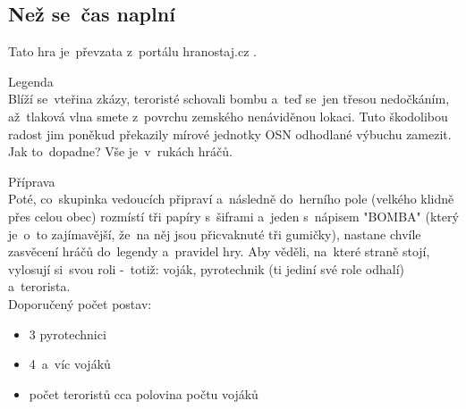 
\vspace{-2mm}
\subsection{Než se~čas naplní}
Tato hra je~převzata z~portálu hranostaj.cz \cite{NezSeCasNaplni}.
\vspace{2mm}

Legenda\vspace{2mm}\\
Blíží se~vteřina zkázy, teroristé schovali bombu a~teď se~jen třesou nedočkáním, až~tlaková vlna smete z~povrchu zemského nenáviděnou lokaci. 
Tuto škodolibou radost jim poněkud překazily mírové jednotky OSN odhodlané výbuchu zamezit. 
Jak to~dopadne? 
Vše je~v~rukách hráčů.

\vspace{2mm}
Příprava\vspace{2mm}\\
Poté, co~skupinka vedoucích připraví a~následně do~herního pole (velkého klidně přes celou obec) rozmístí tři papíry s~šiframi a~jeden s~nápisem "BOMBA" (který je~o~to zajímavější, že~na něj jsou přicvaknuté tři gumičky), nastane chvíle zasvěcení hráčů do~legendy a~pravidel hry. 
Aby věděli, na~které straně stojí, vylosují si~svou roli -~totiž: voják, pyrotechnik (ti jediní své role odhalí) a~terorista.\vspace{2mm}\\
\vspace{2mm}
Doporučený počet postav:
\begin{itemize}
    \item 3 pyrotechnici
    \item 4~a~víc vojáků
    \item počet teroristů cca polovina počtu vojáků
\end{itemize}

